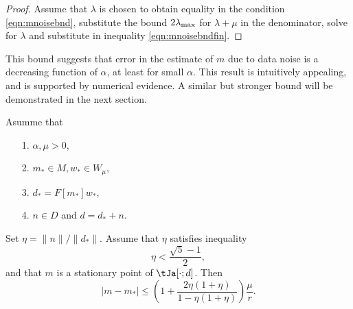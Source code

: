 \begin{proof} Assume that $\lambda$ is chosen to obtain equality in
  the condition \ref{eqn:mnoisebnd}, substitute the bound $2
  \lambda_{\rm max}$ for $\lambda + \mu$ in the denominator, solve for
  $\lambda$ and substitute in inequality \ref{eqn:mnoisebndfin}.
\end{proof}

 This bound 
suggests that error in the estimate of $m$ due to data noise is a
decreasing function of $\alpha$, at least for small $\alpha$. This result is intuitively
appealing, and is supported by numerical evidence. A similar but stronger bound will be demonstrated in the next section.

\begin{theorem}
  \label{thm:mnoiseres}
  Asumme that
  \begin{itemize}
  \item[1. ] $\alpha, \mu> 0$,
  \item[2. ] $m_* \in M, w_* \in W_{\mu}$,
  \item[3. ] $d_* = F[m_*]w_*$,
  \item[4. ] $n \in D$ and $d = d_* + n$.
  \end{itemize}
  Set $\eta = \|n\|/\|d_*\|$. Assume that $\eta$ satisfies inequality \begin{equation}
  \label{eqn:mnoisecond}    
  \eta < \frac{\sqrt{5}-1}{2},
  \end{equation}
  and that $m$ is a stationary point of $\tJa[\cdot;d]$.
  Then
  \begin{equation}
    \label{eqn:mnoisesuff}
    |m-m_*| \le \left(1+\frac{2\eta(1+\eta)}{1-\eta(1+\eta)}\right)\frac{\mu}{r}.
  \end{equation}
\end{theorem}

